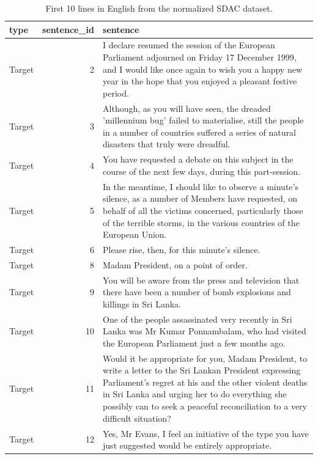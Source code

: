 \documentclass[
  letterpaper,
]{latex/krantz}
\begin{document}
\hypertarget{tbl-td-europarle-en-preview}{}
\begin{table}
\caption{\label{tbl-td-europarle-en-preview}First 10 lines in English from the normalized SDAC dataset. }\tabularnewline

\centering
\begin{tabular}{lrl}
\toprule
type & sentence\_id & sentence\\
\midrule
Target & 2 & I declare resumed the session of the European Parliament adjourned on Friday 17 December 1999, and I would like once again to wish you a happy new year in the hope that you enjoyed a pleasant festive period.\\
Target & 3 & Although, as you will have seen, the dreaded 'millennium bug' failed to materialise, still the people in a number of countries suffered a series of natural disasters that truly were dreadful.\\
Target & 4 & You have requested a debate on this subject in the course of the next few days, during this part-session.\\
Target & 5 & In the meantime, I should like to observe a minute's silence, as a number of Members have requested, on behalf of all the victims concerned, particularly those of the terrible storms, in the various countries of the European Union.\\
Target & 6 & Please rise, then, for this minute's silence.\\
\addlinespace
Target & 8 & Madam President, on a point of order.\\
Target & 9 & You will be aware from the press and television that there have been a number of bomb explosions and killings in Sri Lanka.\\
Target & 10 & One of the people assassinated very recently in Sri Lanka was Mr Kumar Ponnambalam, who had visited the European Parliament just a few months ago.\\
Target & 11 & Would it be appropriate for you, Madam President, to write a letter to the Sri Lankan President expressing Parliament's regret at his and the other violent deaths in Sri Lanka and urging her to do everything she possibly can to seek a peaceful reconciliation to a very difficult situation?\\
Target & 12 & Yes, Mr Evans, I feel an initiative of the type you have just suggested would be entirely appropriate.\\
\bottomrule
\end{tabular}
\end{table}
\end{document}

